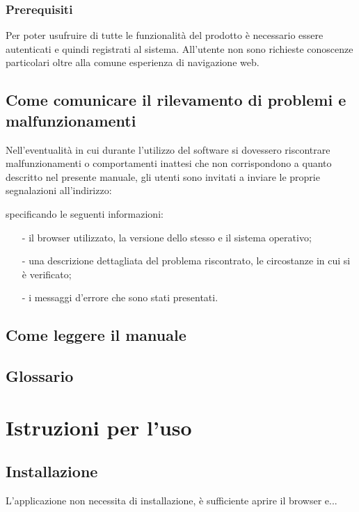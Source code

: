  
\subsubsection{Prerequisiti}
Per poter usufruire di tutte le funzionalità del prodotto è necessario essere autenticati e quindi registrati al sistema.
All'utente non sono richieste conoscenze particolari oltre alla comune esperienza
di navigazione web.

\subsection{Come comunicare il rilevamento di problemi e malfunzionamenti}
Nell'eventualità in cui durante l'utilizzo del software \caName{} si dovessero riscontrare malfunzionamenti o comportamenti inattesi che non corrispondono a quanto descritto nel presente manuale, gli utenti sono invitati a inviare le proprie segnalazioni all'indirizzo:
\begin{center}
  \email{}
\end{center}
specificando le seguenti informazioni:
\begin{itemize}[noitemsep,nolistsep]
  \item[-] il browser utilizzato, la versione dello stesso e il sistema operativo;
  \item[-] una descrizione dettagliata del problema riscontrato, le circostanze in cui si è verificato;
  \item[-] i messaggi d'errore che sono stati presentati.
\end{itemize}

\subsection{Come leggere il manuale}

\subsection{Glossario}
\glossaryIntro


\section{Istruzioni per l'uso}

\subsection{Installazione}
L'applicazione non necessita di installazione, è sufficiente aprire il browser e...
